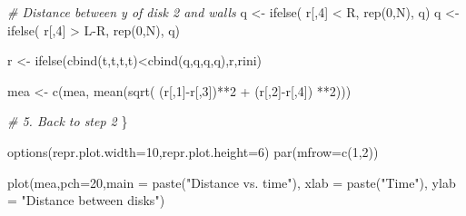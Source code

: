 \documentclass[11pt]{article}
\newenvironment{Shaded}{}{}
\newcommand{\DecValTok}[1]{\textcolor[rgb]{0.25,0.63,0.44}{{#1}}}
\newcommand{\StringTok}[1]{\textcolor[rgb]{0.25,0.44,0.63}{{#1}}}
\newcommand{\CommentTok}[1]{\textcolor[rgb]{0.38,0.63,0.69}{\textit{{#1}}}}
\newcommand{\OtherTok}[1]{\textcolor[rgb]{0.00,0.44,0.13}{{#1}}}
\newcommand{\FunctionTok}[1]{\textcolor[rgb]{0.02,0.16,0.49}{{#1}}}
\newcommand{\NormalTok}[1]{{#1}}
\newcommand{\SpecialCharTok}[1]{\textcolor[rgb]{0.25,0.44,0.63}{{#1}}}
\newcommand{\AttributeTok}[1]{\textcolor[rgb]{0.49,0.56,0.16}{{#1}}}
\begin{document}
\begin{Shaded}
\begin{Highlighting}[]
        \CommentTok{\# Distance between y of disk 2 and walls}
\NormalTok{        q }\OtherTok{\textless{}{-}} \FunctionTok{ifelse}\NormalTok{( r[,}\DecValTok{4}\NormalTok{] }\SpecialCharTok{\textless{}}\NormalTok{ R, }\FunctionTok{rep}\NormalTok{(}\DecValTok{0}\NormalTok{,N), q)}
\NormalTok{        q }\OtherTok{\textless{}{-}} \FunctionTok{ifelse}\NormalTok{( r[,}\DecValTok{4}\NormalTok{] }\SpecialCharTok{\textgreater{}}\NormalTok{ L}\SpecialCharTok{{-}}\NormalTok{R, }\FunctionTok{rep}\NormalTok{(}\DecValTok{0}\NormalTok{,N), q)}
        
\NormalTok{        r }\OtherTok{\textless{}{-}} \FunctionTok{ifelse}\NormalTok{(}\FunctionTok{cbind}\NormalTok{(t,t,t,t)}\SpecialCharTok{\textless{}}\FunctionTok{cbind}\NormalTok{(q,q,q,q),r,rini)}
        
\NormalTok{        mea }\OtherTok{\textless{}{-}} \FunctionTok{c}\NormalTok{(mea, }\FunctionTok{mean}\NormalTok{(}\FunctionTok{sqrt}\NormalTok{( (r[,}\DecValTok{1}\NormalTok{]}\SpecialCharTok{{-}}\NormalTok{r[,}\DecValTok{3}\NormalTok{])}\SpecialCharTok{**}\DecValTok{2} \SpecialCharTok{+}\NormalTok{ (r[,}\DecValTok{2}\NormalTok{]}\SpecialCharTok{{-}}\NormalTok{r[,}\DecValTok{4}\NormalTok{]) }\SpecialCharTok{**}\DecValTok{2}\NormalTok{)))}
        
        \CommentTok{\# 5. Back to step 2}
\NormalTok{        \}}
    
    \FunctionTok{options}\NormalTok{(}\AttributeTok{repr.plot.width=}\DecValTok{10}\NormalTok{,}\AttributeTok{repr.plot.height=}\DecValTok{6}\NormalTok{)}
    \FunctionTok{par}\NormalTok{(}\AttributeTok{mfrow=}\FunctionTok{c}\NormalTok{(}\DecValTok{1}\NormalTok{,}\DecValTok{2}\NormalTok{))}
    
    \FunctionTok{plot}\NormalTok{(mea,}\AttributeTok{pch=}\DecValTok{20}\NormalTok{,}\AttributeTok{main =} \FunctionTok{paste}\NormalTok{(}\StringTok{"Distance vs. time"}\NormalTok{),}
             \AttributeTok{xlab =} \FunctionTok{paste}\NormalTok{(}\StringTok{"Time"}\NormalTok{), }\AttributeTok{ylab =} \StringTok{"Distance between disks"}\NormalTok{)}
    

\end{Highlighting}
\end{Shaded}
\end{document}
